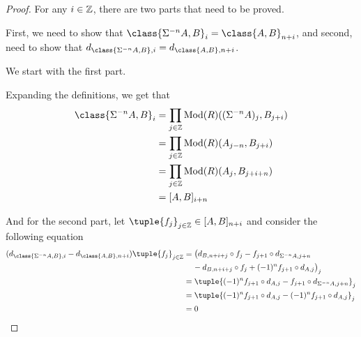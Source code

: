 \begin{proof}
    For any \( i \in {\mathbb{Z}} \), there are two parts that need to be proved.

    First, we need to show that \( \class{\Sigma^{-n} A, B}_i = \class{A, B}_{n + i} \), and second, need to show that \( d_{\class{\Sigma^{-n} A, B}, i} = d_{\class{A, B}, n + i} \).

    We start with the first part.

    Expanding the definitions, we get that
    \begin{align*}
        \class{\Sigma^{-n} A, B}_i &= \prod_{j \in \Zb} \Mod(R)((\Sigma^{-n} A)_j, B_{j + i}) \\
        &= \prod_{j \in \Zb} \Mod(R)(A_{j - n}, B_{j + i}) \\
        &= \prod_{j \in \Zb} \Mod(R)(A_j, B_{j + i + n}) \\
        &= [A, B]_{i + n}
    \end{align*}

    And for the second part, let \( \tuple{f_j}_{j \in \Zb} \in [A, B]_{n + i} \) and consider the following equation
    \begin{align*}
        (d_{\class{\Sigma^{-n} A, B}, i} - d_{\class{A, B}, n + i})\tuple{f_j}_{j \in \Zb} &= \big(d_{B, n + i + j} \circ f_j - f_{j + 1} \circ d_{\Sigma^{-n} A, j + n} \\
        &\hspace{0.4cm} - d_{B, n + i + j} \circ f_j + (-1)^n f_{j + 1} \circ d_{A, j}\big)_j \\
        &= \tuple{(-1)^n f_{j + 1} \circ d_{A, j} - f_{j + 1} \circ d_{\Sigma^{-n} A, j + n}}_j \\
        &= \tuple{(-1)^n f_{j + 1} \circ d_{A, j} - (-1)^n f_{j + 1} \circ d_{A, j}}_j \\
        &= 0 \qedhere
    \end{align*}
\end{proof}

